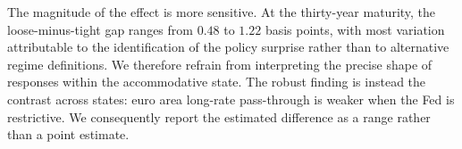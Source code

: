 
The magnitude of the effect is more sensitive. At the thirty-year maturity, the loose-minus-tight gap ranges from $0.48$ to $1.22$ basis points, with most variation attributable to the identification of the policy surprise rather than to alternative regime definitions. We therefore refrain from interpreting the precise shape of responses within the accommodative state. The robust finding is instead the contrast across states: euro area long-rate pass-through is weaker when the Fed is restrictive. We consequently report the estimated difference as a range rather than a point estimate.


